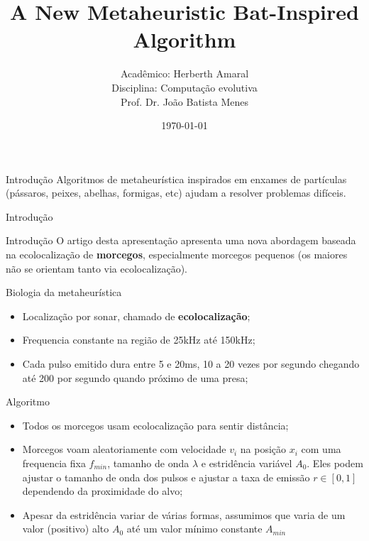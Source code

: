 \documentclass{beamer}
\title{A New Metaheuristic Bat-Inspired Algorithm }
\date{\today}
\author{Acadêmico: Herberth Amaral \\
Disciplina: Computação evolutiva \\
Prof. Dr. João Batista Menes}
\institute{Programa de Pós-Graduação em Modelagem Computacional e Sistemas - UNIMONTES}
\begin{document}
  \maketitle

  \begin{frame}{Introdução}
      Algoritmos de metaheurística inspirados em enxames de partículas (pássaros, peixes, abelhas, formigas, etc) ajudam a resolver problemas difíceis.
  \end{frame}

  \begin{frame}{Introdução}
  \end{frame}

  \begin{frame}{Introdução}
      O artigo desta apresentação apresenta uma nova abordagem baseada na ecolocalização de \textbf{morcegos}, especialmente morcegos pequenos (os maiores não se orientam tanto via ecolocalização).
  \end{frame}

  \begin{frame}{Biologia da metaheurística}
      \begin{itemize}
          \item Localização por sonar, chamado de \textbf{ecolocalização};
          \item Frequencia constante na região de 25kHz até 150kHz;
          \item Cada pulso emitido dura entre 5 e 20ms, 10 a 20 vezes por segundo chegando até 200 por segundo quando próximo de uma presa;
      \end{itemize}
  \end{frame}

  \begin{frame}{Algoritmo}
      \begin{itemize}
          \item Todos os morcegos usam ecolocalização para sentir distância;
          \item Morcegos voam aleatoriamente com velocidade $v_i$ na posição $x_i$ com uma frequencia fixa $f_{min}$, tamanho de onda $\lambda$ e estridência variável $A_0$. Eles podem ajustar o tamanho de onda dos pulsos e ajustar a taxa de emissão $r \in [0,1]$ dependendo da proximidade do alvo;
          \item Apesar da estridência variar de várias formas, assumimos que varia de um valor (positivo) alto $A_0$ até um valor mínimo constante $A_{min}$
      \end{itemize}
  \end{frame}
\end{document}
